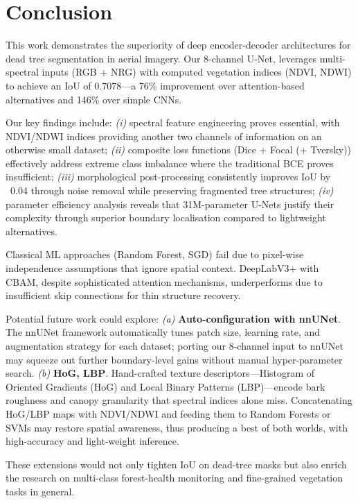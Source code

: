 \section{Conclusion}

This work demonstrates the superiority of deep encoder-decoder architectures for dead tree segmentation in aerial imagery. Our 8-channel U-Net, leverages multi-spectral inputs (RGB + NRG) with computed vegetation indices (NDVI, NDWI) to achieve an IoU of 0.7078—a 76\% improvement over attention-based alternatives and 146\% over simple CNNs.

Our key findings include: \emph{(i)} spectral feature engineering proves essential, with NDVI/NDWI indices providing another two channels of information on an otherwise small dataset; \emph{(ii)} composite loss functions (Dice + Focal (+ Tversky)) effectively address extreme class imbalance where the traditional BCE proves insufficient; \emph{(iii)} morphological post-processing consistently improves IoU by ~0.04 through noise removal while preserving fragmented tree structures; \emph{(iv)} parameter efficiency analysis reveals that 31M-parameter U-Nets justify their complexity through superior boundary localisation compared to lightweight alternatives.

Classical ML approaches (Random Forest, SGD) fail due to pixel-wise independence assumptions that ignore spatial context. DeepLabV3+ with CBAM, despite sophisticated attention mechanisms, underperforms due to insufficient skip connections for thin structure recovery.

Potential future work could explore:
\emph{(a)} \textbf{Auto-configuration with nnUNet}. The nnUNet framework automatically tunes patch size, learning rate, and augmentation strategy for each dataset; porting our 8-channel input to nnUNet may squeeze out further boundary-level gains without manual hyper-parameter search.  
\emph{(b)} \textbf{HoG, LBP}.  Hand-crafted texture descriptors—Histogram of Oriented Gradients (HoG) and Local Binary Patterns (LBP)—encode bark roughness and canopy granularity that spectral indices alone miss. Concatenating HoG/LBP maps with NDVI/NDWI and feeding them to Random Forests or SVMs may restore spatial awareness, thus producing a best of both worlds, with high-accuracy and light-weight inference.

These extensions would not only tighten IoU on dead-tree masks but also enrich the research on multi-class forest-health monitoring and fine-grained vegetation tasks in general.
